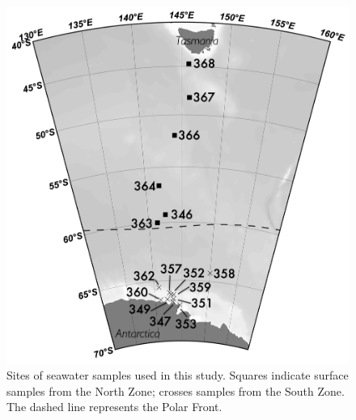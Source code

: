 \begin{figure}
  \centering
  \includegraphics[width=\textwidth]{../polarfront/samplemap.png}
  \caption[Map showing sites of seawater samples used in the Polar Front study]{Sites of seawater samples used in this study. 
  Squares indicate surface samples from the North Zone; crosses samples from the South Zone. 
  The dashed line represents the Polar Front.}
  \label{fig:samplemap}
\end{figure}
